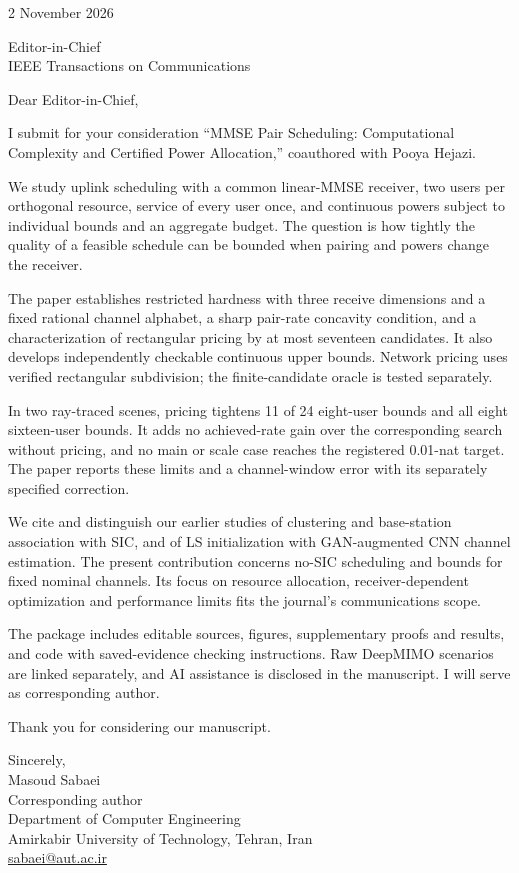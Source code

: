 \documentclass[11pt]{article}
\begin{document}
\hfill 2 November 2026

Editor-in-Chief\\IEEE Transactions on Communications

Dear Editor-in-Chief,

I submit for your consideration ``MMSE Pair Scheduling: Computational Complexity and Certified Power Allocation,'' coauthored with Pooya Hejazi.

We study uplink scheduling with a common linear-MMSE receiver, two users per orthogonal resource, service of every user once, and continuous powers subject to individual bounds and an aggregate budget. The question is how tightly the quality of a feasible schedule can be bounded when pairing and powers change the receiver.

The paper establishes restricted hardness with three receive dimensions and a fixed rational channel alphabet, a sharp pair-rate concavity condition, and a characterization of rectangular pricing by at most seventeen candidates. It also develops independently checkable continuous upper bounds. Network pricing uses verified rectangular subdivision; the finite-candidate oracle is tested separately.

In two ray-traced scenes, pricing tightens 11 of 24 eight-user bounds and all eight sixteen-user bounds. It adds no achieved-rate gain over the corresponding search without pricing, and no main or scale case reaches the registered 0.01-nat target. The paper reports these limits and a channel-window error with its separately specified correction.

We cite and distinguish our earlier studies of clustering and base-station association with SIC, and of LS initialization with GAN-augmented CNN channel estimation. The present contribution concerns no-SIC scheduling and bounds for fixed nominal channels. Its focus on resource allocation, receiver-dependent optimization and performance limits fits the journal's communications scope.

The package includes editable sources, figures, supplementary proofs and results, and code with saved-evidence checking instructions. Raw DeepMIMO scenarios are linked separately, and AI assistance is disclosed in the manuscript. I will serve as corresponding author.

Thank you for considering our manuscript.

Sincerely,\\
Masoud Sabaei\\
Corresponding author\\
Department of Computer Engineering\\
Amirkabir University of Technology, Tehran, Iran\\
\href{mailto:sabaei@aut.ac.ir}{sabaei@aut.ac.ir}
\end{document}
